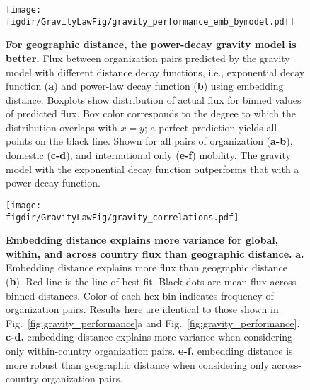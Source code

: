 \documentclass[12pt]{article} %
\def\figdir{../Figs}
\begin{document}
%
%
\begin{figure}[p!]
	\centering
	\texttt{[image: \\figdir/GravityLawFig/gravity\_performance\_emb\_bymodel.pdf]}
	\caption{
		\textbf{For geographic distance, the power-decay gravity model is better.}
		Flux between organization pairs predicted by the gravity model with different distance decay functions, i.e., exponential decay function (\textbf{a}) and power-law decay function (\textbf{b}) using embedding distance.
		Boxplots show distribution of actual flux for binned values of predicted flux.
		Box color corresponds to the degree to which the distribution overlaps with $x = y$; 
		a perfect prediction yields all points on the black line.
		Shown for all pairs of organization (\textbf{a-b}), domestic (\textbf{c-d}), and international only (\textbf{e-f}) mobility.
		The gravity model with the exponential decay function outperforms that with a power-decay function.
	}
	\label{fig:supp:predict_emb_bymodel}
\end{figure}



%
%
\begin{figure}[p!]
	\centering
	\texttt{[image: \\figdir/GravityLawFig/gravity\_correlations.pdf]}
	\caption{
		\textbf{Embedding distance explains more variance for global, within, and across country flux than geographic distance.}
		\textbf{a.}
		Embedding distance explains more flux than geographic distance (\textbf{b}).
		Red line is the line of best fit.
		Black dots are mean flux across binned distances.
		Color of each hex bin indicates frequency of organization pairs.
		Results here are identical to those shown in Fig.~\ref{fig:gravity_performance}a and Fig.~\ref{fig:gravity_performance}.
		\textbf{c-d.}	embedding distance explains more variance when considering only within-country organization pairs.
		\textbf{e-f.} embedding distance is more robust than geographic distance when considering only across-country organization pairs.
	}
	\label{fig:supp:gravity_correlation}
\end{figure}
\end{document}
